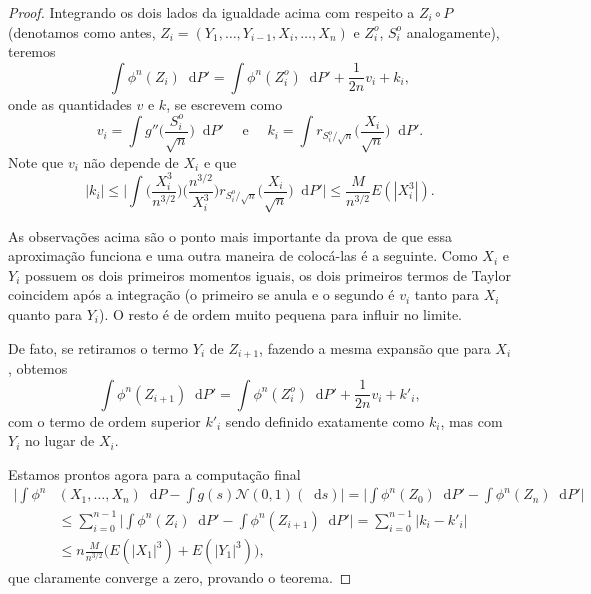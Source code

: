 \documentclass[reqno]{article}
\newcommand*\1{\mathds{1}}
\renewcommand*\d{\mathop{}\!\mathrm{d}}
\begin{document}
\begin{proof}
  Integrando os dois lados da igualdade acima com respeito a $Z_i \circ P$ (denotamos como antes, $Z_i = (Y_1, \dots, Y_{i-1}, X_i, \dots, X_n)$ e $Z_i^o$, $S_i^o$ analogamente), teremos
  \begin{equation}
    \int \phi^n(Z_i) \d P' = \int \phi^n(Z_i^o) \d P' + \frac{1}{2n} v_i + k_i,
  \end{equation}
  onde as quantidades $v$ e $k$, se escrevem como
  \begin{equation}
    v_i = \int g'' \Big( \frac{S_i^o}{\sqrt{n}} \Big) \d P' \quad \text{ e } \quad k_i = \int r_{S_i^o/\sqrt{n}} \Big(\frac{X_i}{\sqrt{n}}\Big) \d P'.
  \end{equation}
  Note que $v_i$ não depende de $X_i$ e que
  \begin{equation}
    |k_i| \leq \Big| \int \Big(\frac{X_i^3}{n^{3/2}}\Big) \Big(\frac{n^{3/2}}{X_i^3}\Big) r_{S_i^o/\sqrt{n}} \Big(\frac{X_i}{\sqrt{n}}\Big) \d P' \Big| \leq \frac{M}{n^{3/2}} E(|X_i^3|).
  \end{equation}

  As observações acima são o ponto mais importante da prova de que essa aproximação funciona e uma outra maneira de colocá-las é a seguinte.
  Como $X_i$ e $Y_i$ possuem os dois primeiros momentos iguais, os dois primeiros termos de Taylor coincidem após a integração (o primeiro se anula e o segundo é $v_i$ tanto para $X_i$ quanto para $Y_i$).
  O resto é de ordem muito pequena para influir no limite.

  De fato, se retiramos o termo $Y_i$ de $Z_{i+1}$, fazendo a mesma expansão que para $X_i$, obtemos
  \begin{equation}
    \int \phi^n(Z_{i+1}) \d P' = \int \phi^n(Z_i^o) \d P' + \frac{1}{2n} v_i + k'_i,
  \end{equation}
  com o termo de ordem superior $k'_i$ sendo definido exatamente como $k_i$, mas com $Y_i$ no lugar de $X_i$.

  Estamos prontos agora para a computação final
  \begin{equation*}
    \begin{split}
      \Big| \int \phi^n & (X_1, \dots, X_n) \d P - \int g(s) \mathcal{N}(0,1)(\d s) \Big| = \Big| \int \phi^n(Z_0) \d P' - \int \phi^n(Z_n) \d P' \Big|\\
      & \leq \sum_{i=0}^{n-1} \Big| \int \phi^n(Z_{i}) \d P' - \int \phi^n(Z_{i+1}) \d P' \Big| = \sum_{i=0}^{n-1} |k_i - k'_i|\\
      & \leq n \frac{M}{n^{3/2}} \big(E(|X_1|^3) + E(|Y_1|^3) \big),
    \end{split}
  \end{equation*}
  que claramente converge a zero, provando o teorema.
\end{proof}
\end{document}
